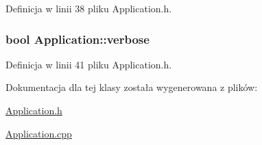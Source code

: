 \-Definicja w linii 38 pliku \-Application.\-h.

\hypertarget{class_application_af116b891333df3a62cf85e3dc0859e03}{
\subsubsection[{verbose}]{\setlength{\rightskip}{0pt plus 5cm}bool {\bf \-Application\-::verbose}}}\label{class_application_af116b891333df3a62cf85e3dc0859e03}


\-Definicja w linii 41 pliku \-Application.\-h.



\-Dokumentacja dla tej klasy została wygenerowana z plików\-:\begin{DoxyCompactItemize}
\item 
\hyperlink{_application_8h}{\-Application.\-h}\item 
\hyperlink{_application_8cpp}{\-Application.\-cpp}\end{DoxyCompactItemize}
